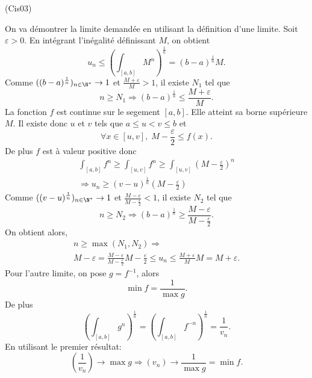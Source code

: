 \begin{tiny}(Cis03)\end{tiny}
On va démontrer la limite demandée en utilisant la définition d'une limite.\newline
Soit $\varepsilon > 0$.\newline
En intégrant l'inégalité définissant $M$, on obtient
\[
 u_n \leq \left( \int_{\left[ a,b\right] } M^n\right)^{\frac{1}{n}}
 = (b-a)^{\frac{1}{n}}M.
\]
Comme $((b-a)^{\frac{1}{n}})_{n \in \N^*}\rightarrow 1$ et $\frac{M + \varepsilon}{M} > 1$, il existe $N_1$ tel que
\[
 n \geq N_1 \Rightarrow (b-a)^{\frac{1}{n}} \leq \frac{M + \varepsilon}{M}.
\]
La fonction $f$ est continue sur le segement $\left[ a,b \right]$. Elle atteint sa borne supérieure $M$. Il existe donc $u$ et $v$ tels que
$a\leq u < v \leq b$ et
\[
 \forall x \in \left[ u,v \right], \; M - \frac{\varepsilon}{2} \leq f(x). 
\]
De plus $f$ est à valeur positive donc 
\begin{multline*}
 \int_{\left[ a,b\right] }f^n \geq \int_{\left[ u,v\right] }f^n
 \geq \int_{\left[ u,v\right] }(M-\frac{\varepsilon}{2})^n \\
 \Rightarrow u_n \geq (v-u)^{\frac{1}{n}}(M-\frac{\varepsilon}{2})
\end{multline*}
Comme $((v-u)^{\frac{1}{n}})_{n \in \N^*}\rightarrow 1$ et $\frac{M - \varepsilon}{M-\frac{\varepsilon}{2}} < 1$, il existe $N_2$ tel que
\[
 n \geq N_2 \Rightarrow (b-a)^{\frac{1}{n}} \geq \frac{M - \varepsilon}{M-\frac{\varepsilon}{2}}.
\]
On obtient alors,
\begin{multline*}
 n \geq \max(N_1,N_2) 
 \Rightarrow \\
 M - \varepsilon = \frac{M - \varepsilon}{M-\frac{\varepsilon}{2}} M-\frac{\varepsilon}{2}
 \leq u_n \leq 
 \frac{M + \varepsilon}{M} M = M + \varepsilon.
\end{multline*}
Pour l'autre limite, on pose $g = f^{-1}$, alors
\[
 \min f = \frac{1}{\max g}.
\]
De plus
\[
 \left( \int_{\left[ a,b\right] }g^n\right)^{\frac{1}{n}} 
 = \left( \int_{\left[ a,b\right] }f^{-n}\right)^{\frac{1}{n}}
 = \frac{1}{v_n}.
\]
En utilisant le premier résultat:
\[
 (\frac{1}{v_n})\rightarrow \max g \Rightarrow (v_n)\rightarrow \frac{1}{\max g} = \min f.
\]


